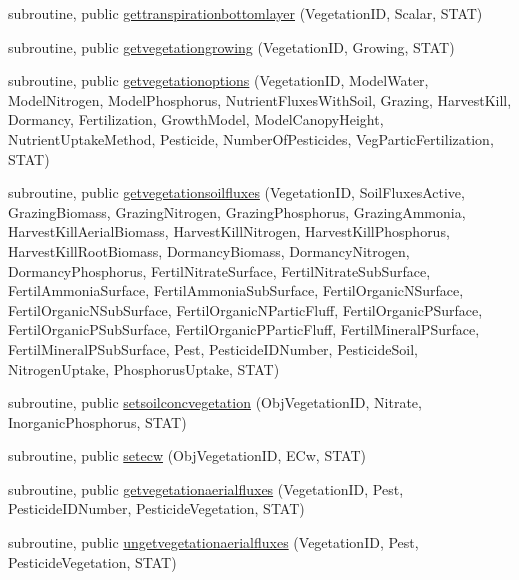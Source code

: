 \begin{DoxyCompactItemize}
\item 
subroutine, public \mbox{\hyperlink{namespacemodulevegetation_ad98c388458251c42c13f5d7ee73e3b9f}{gettranspirationbottomlayer}} (Vegetation\+ID, Scalar, S\+T\+AT)
\item 
subroutine, public \mbox{\hyperlink{namespacemodulevegetation_ad0a29b6dd966a910007e5e5268c1bb4a}{getvegetationgrowing}} (Vegetation\+ID, Growing, S\+T\+AT)
\item 
subroutine, public \mbox{\hyperlink{namespacemodulevegetation_a95ec1a8e366b1743687f4824f5ac8672}{getvegetationoptions}} (Vegetation\+ID, Model\+Water, Model\+Nitrogen, Model\+Phosphorus, Nutrient\+Fluxes\+With\+Soil, Grazing, Harvest\+Kill, Dormancy, Fertilization, Growth\+Model, Model\+Canopy\+Height, Nutrient\+Uptake\+Method, Pesticide, Number\+Of\+Pesticides, Veg\+Partic\+Fertilization, S\+T\+AT)
\item 
subroutine, public \mbox{\hyperlink{namespacemodulevegetation_a5ab5e21fef383950e0f159dd2ad953aa}{getvegetationsoilfluxes}} (Vegetation\+ID, Soil\+Fluxes\+Active, Grazing\+Biomass, Grazing\+Nitrogen, Grazing\+Phosphorus, Grazing\+Ammonia, Harvest\+Kill\+Aerial\+Biomass, Harvest\+Kill\+Nitrogen, Harvest\+Kill\+Phosphorus, Harvest\+Kill\+Root\+Biomass, Dormancy\+Biomass, Dormancy\+Nitrogen, Dormancy\+Phosphorus, Fertil\+Nitrate\+Surface, Fertil\+Nitrate\+Sub\+Surface, Fertil\+Ammonia\+Surface, Fertil\+Ammonia\+Sub\+Surface, Fertil\+Organic\+N\+Surface, Fertil\+Organic\+N\+Sub\+Surface, Fertil\+Organic\+N\+Partic\+Fluff, Fertil\+Organic\+P\+Surface, Fertil\+Organic\+P\+Sub\+Surface, Fertil\+Organic\+P\+Partic\+Fluff, Fertil\+Mineral\+P\+Surface, Fertil\+Mineral\+P\+Sub\+Surface, Pest, Pesticide\+I\+D\+Number, Pesticide\+Soil, Nitrogen\+Uptake, Phosphorus\+Uptake, S\+T\+AT)
\item 
subroutine, public \mbox{\hyperlink{namespacemodulevegetation_a38d68bd81032a262aeb48e983401e19a}{setsoilconcvegetation}} (Obj\+Vegetation\+ID, Nitrate, Inorganic\+Phosphorus, S\+T\+AT)
\item 
subroutine, public \mbox{\hyperlink{namespacemodulevegetation_af9791218901ea10557b2795395421159}{setecw}} (Obj\+Vegetation\+ID, E\+Cw, S\+T\+AT)
\item 
subroutine, public \mbox{\hyperlink{namespacemodulevegetation_a2c86b41a4e32d9f80ab445ee7695a777}{getvegetationaerialfluxes}} (Vegetation\+ID, Pest, Pesticide\+I\+D\+Number, Pesticide\+Vegetation, S\+T\+AT)
\item 
subroutine, public \mbox{\hyperlink{namespacemodulevegetation_a820fdd3d0dd1463d385d92be5758637b}{ungetvegetationaerialfluxes}} (Vegetation\+ID, Pest, Pesticide\+Vegetation, S\+T\+AT)

\end{DoxyCompactItemize}
